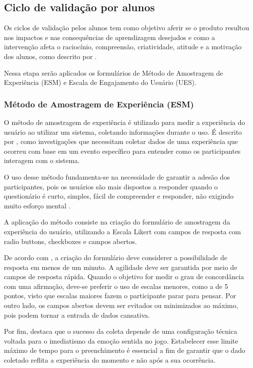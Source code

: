 \documentclass{abnt}
\begin{document}
\subsection{Ciclo de validação por alunos}
Os ciclos de validação pelos alunos tem como objetivo aferir se o produto
resultou nos impactos e nas consequências de aprendizagem desejados e como a
intervenção afeta o raciocínio, compreensão, criatividade, atitude e a motivação
dos alunos, como descrito por \cite{plomp2018pesquisa}.

Nessa etapa serão aplicados os formulários de Método de Amostragem de
Experiência (ESM) e Escala de Engajamento do Usuário (UES).

\subsubsection{Método de Amostragem de Experiência (ESM)}
O método de amostragem de experiência é utilizado para medir a experiência do
usuário ao utilizar um sistema, coletando informações durante o uso. É descrito
por \cite{francisco2020esm}, como investigações que necessitam coletar dados de
uma experiência que ocorreu com base em um evento específico para entender como
os participantes interagem com o sistema.

O uso desse método fundamenta-se na necessidade de garantir a adesão dos
participantes, pois os usuários são mais dispostos a responder quando o
questionário é curto, simples, fácil de compreender e responder, não exigindo
muito esforço mental \cite{francisco2020esm}.

A aplicação do método consiste na criação do formulário de amostragem da
experiência do usuário, utilizando a Escala Likert com campos de resposta com
radio buttons, checkboxes e campos abertos. 

De acordo com \cite{francisco2020esm}, a criação do formulário deve considerer a
possibilidade de resposta em menos de um minuto. A agilidade deve ser garantida
por meio de campos de resposta rápida. Quando o objetivo for medir o grau de
concordância com uma afirmação, deve-se preferir o uso de escalas menores, como
a de 5 pontos, visto que escalas maiores fazem o participante parar para pensar.
Por outro lado, os campos abertos devem ser evitados ou minimizados ao máximo,
pois podem tornar a entrada de dados cansativa.

Por fim, \cite{francisco2020esm} destaca que o sucesso da coleta depende de uma
configuração técnica voltada para o imediatismo da emoção sentida no jogo.
Estabelecer esse limite máximo de tempo para o preenchimento é essencial a fim
de garantir que o dado coletado reflita a experiência do momento e não após a
sua ocorrência.
\end{document}
